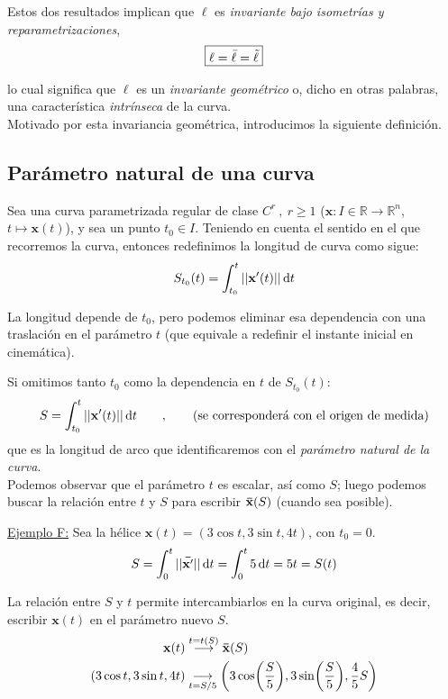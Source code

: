 Estos dos resultados implican que $\ell$ es \emph{invariante bajo isometrías y reparametrizaciones},
$$
\boxed{\ell=\Bar{\ell}=\Tilde{\ell}}
$$

lo cual significa que $\ell$ es un \emph{invariante geométrico} o, dicho en otras palabras, una característica \emph{intrínseca} de la curva.\\ %

Motivado por esta invariancia geométrica, introducimos la siguiente definición.

\subsection{Parámetro natural de una curva}
Sea una curva parametrizada regular de clase $C^r \ , \ r\ge 1$ ($\mathbf{x}:I \in \mathbb{R}\longrightarrow \mathbb{R}^n$, $t\longmapsto \mathbf{x}(t)$), y sea un punto $t_0 \in I$. Teniendo en cuenta el sentido en el que recorremos la curva, entonces redefinimos la longitud de curva como sigue:
$$
S_{t_0}(t)=\int _{t_0}^t||\mathbf{x'}(t)|| \odif{t}     %
$$

La longitud depende de $t_0$, pero podemos eliminar esa dependencia con una traslación en el parámetro $t$ (que equivale a redefinir el instante inicial en cinemática).

Si omitimos tanto $t_0$ como la dependencia en $t$ de $S_{t_0}(t)$:
$$
S=\int _{t_0}^t||\mathbf{x'}(t)|| \odif{t} \qquad , \qquad (\text{se corresponderá con el origen de medida})
$$
que es la longitud de arco que identificaremos con el \emph{parámetro natural de la curva}.\\

Podemos observar que el parámetro $t$ es escalar, así como $S$; luego podemos buscar la relación entre $t$ y $S$ para escribir $\mathbf{\Bar{x}}(S)$ (cuando sea posible).

\begin{mybox}
    \underline{Ejemplo F:} Sea la hélice $\mathbf{x}(t)=(3\cos{t},3\sin{t},4t)$, con $t_0=0$.
    $$
    S=\int_0^t ||\mathbf{\Bar{x'}}||\odif{t}=\int _0^t 5\odif{t}=5t=S(t)
    $$

    La relación entre $S$ y $t$ permite intercambiarlos en la curva original, es decir, escribir $\mathbf{x}(t)$ en el parámetro nuevo $S$.
    \begin{align*}
        \mathbf{x}(t) &\overset{t=t(S)}{\longrightarrow}\mathbf{\Bar{x}}(S)\\
        (3\cos{t},3\sin{t},4t)& \underset{t=S/5}{\longrightarrow} \left (3\cos(\frac{S}{5}),3\sin(\frac{S}{5}),\frac{4}{5}S \right )
    \end{align*}
\end{mybox}

